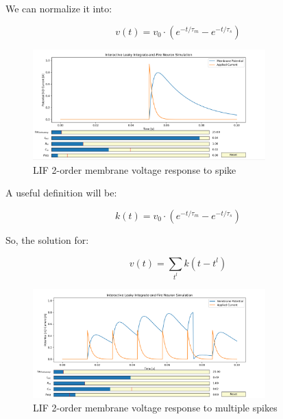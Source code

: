 We can normalize it into:

\begin{equation}
    v(t) = v_0 \cdot (e^{-t/\tau_m} - e^{-t/\tau_s})
\end{equation}

\begin{figure}[H]
    \centering
    \includegraphics[width=0.8\textwidth]{methods/computational-models/graphs/LIF-second-order.png}
    \caption{LIF 2-order membrane voltage response to spike}
    \label{fig:LIF-second-order}
\end{figure}

A useful definition will be:

\begin{equation}
    k(t) = v_0 \cdot (e^{-t/\tau_m} - e^{-t/\tau_s})
\end{equation}

So, the solution for:

\begin{equation}
    v(t) = \sum_{t^l} k(t - t^l)
\end{equation}

\begin{figure}[H]
    \centering
    \includegraphics[width=0.8\textwidth]{methods/computational-models/graphs/LIF-spike-response-second-order.png}
    \caption{LIF 2-order membrane voltage response to multiple spikes}
    \label{fig:LIF-second-order-spike-response}
\end{figure}

